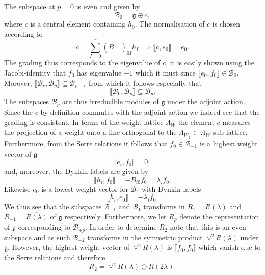 The subspace at $p=0$ is even and given by 
\begin{equation}
    \mathscr{B}_0 = \mathfrak{g}\oplus c,
\end{equation}
where $c$ is a central element containing $h_0$. The normalisation of $c$ is chosen according to 
\begin{equation}
     c = \sum_{I=0}^r(B^{-1})_{0I}h_I \implies \llbracket c,e_0 \rrbracket = e_0.
\end{equation}
The grading thus corresponds to the eigenvalue of $c$, it is easily shown using the Jacobi-identity that $f_0$ has eigenvalue $-1$ which it must since $\llbracket e_0,f_0\rrbracket\in \mathscr{B}_0$. Morover, $\llbracket\mathscr{B}_r,\mathscr{B}_p\rrbracket \subseteq \mathscr{B}_{p+r}$ from which it follows especially that 
\begin{equation}
    \llbracket\mathscr{B}_0,\mathscr{B}_p\rrbracket \subseteq \mathscr{B}_p.
\end{equation}
The subspaces $\mathscr{B}_p$ are thus irreducible modules of $\mathfrak{g}$ under the adjoint action. Since the $c$ by definition commutes with the adjoint action we indeed see that the grading is consistent. In terms of the weight lattice $\Lambda_W$ the element $c$ measures the projection of a weight onto a line orthogonal to the $\Lambda_{W_\mathfrak{g}}\subset \Lambda_W$ sub-lattice. Furthermore, from the Serre relations it follows that $f_0\in\mathscr{B}_{-1}$ is a highest weight vector of $\mathfrak{g}$ 
\begin{equation}
    \llbracket e_i, f_0\rrbracket = 0,
\end{equation}
and, moreover, the Dynkin labels are given by 
\begin{equation}
    \llbracket h_i,f_0\rrbracket = -B_{i0}f_0 = \lambda_if_0.
\end{equation}
Likewise $e_0$ is a lowest weight vector for $\mathscr{B}_1$ with Dynkin labels
\begin{equation}
    \llbracket h_i,e_0\rrbracket = -\lambda_if_0.
\end{equation}
We thus see that the subspaces $\mathscr{B}_{-1}$ and $\mathscr{B}_1$ transforms in $R_1=R(\lambda)$ and $R_{-1}=\overbar{R(\lambda)}$ of $\mathfrak{g}$ respectively. Furthermore, we let $R_{p}$ denote the representation of $\mathfrak{g}$ corresponding to $\mathscr{B}_{\mp p}$. In order to determine $R_2$ note that this is an even subspace and as such $\mathscr{B}_{-2}$ transforms in the symmetric product $\vee^2R(\lambda)$ under $\mathfrak{g}$. However, the highest weight vector of $\vee^2R(\lambda)$ is $\llbracket f_0,f_0\rrbracket$ which vanish due to the Serre relations and therefore 
\begin{equation}
    R_2 = \vee^2R(\lambda)\ominus R(2\lambda).
\end{equation}

